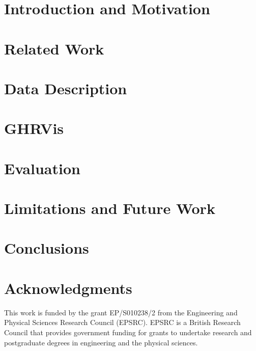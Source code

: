 \documentclass{egpubl}
\begin{document}
\begin{abstract}

\end{abstract}

\section{Introduction and Motivation}

\section{Related Work}

\section{Data Description}

\section{GHRVis}

\section{Evaluation}

\section{Limitations and Future Work}

\section{Conclusions}


\section{Acknowledgments}
This work is funded by the grant EP/S010238/2 from the Engineering and Physical Sciences Research Council (EPSRC). EPSRC is a British Research Council that provides government funding for grants to undertake research and postgraduate degrees in engineering and the physical sciences. 

\let\section=\origsection
\printbibliography
\end{document}

